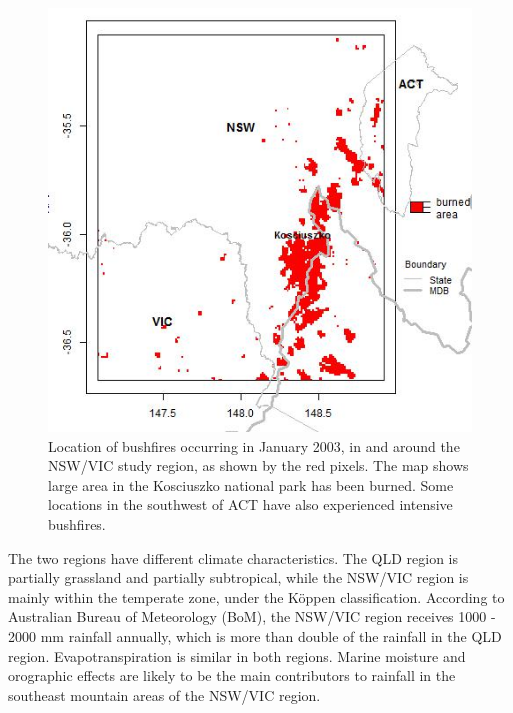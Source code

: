 \documentclass[]{elsarticle} %
\theoremstyle{definition}
\theoremstyle{definition}
\theoremstyle{definition}
\theoremstyle{remark}
\begin{document}
\begin{figure}
\includegraphics[width=0.9\linewidth]{figures/bushfire_nswvic} \caption{Location of bushfires occurring in January 2003, in and around the NSW/VIC study region, as shown by the red pixels. The map shows large area in the Kosciuszko national park has been burned. Some locations in the southwest of ACT have also experienced intensive bushfires.}\label{fig:figure2bushfire}
\end{figure}

The two regions have different climate characteristics. The QLD region
is partially grassland and partially subtropical, while the NSW/VIC
region is mainly within the temperate zone, under the Köppen
classification. According to Australian Bureau of Meteorology (BoM), the
NSW/VIC region receives 1000 - 2000 mm rainfall annually, which is more
than double of the rainfall in the QLD region. Evapotranspiration is
similar in both regions. Marine moisture and orographic effects are
likely to be the main contributors to rainfall in the southeast mountain
areas of the NSW/VIC region.
\end{document}
